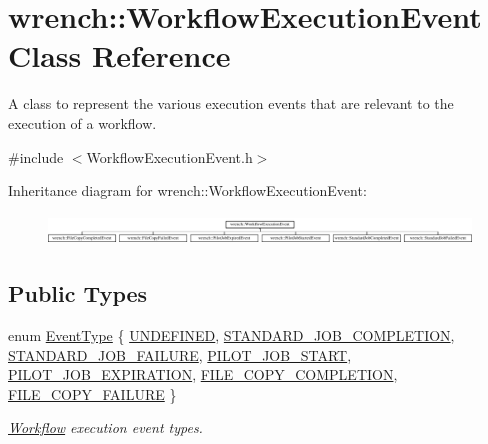 \hypertarget{classwrench_1_1_workflow_execution_event}{}\section{wrench\+:\+:Workflow\+Execution\+Event Class Reference}
\label{classwrench_1_1_workflow_execution_event}


A class to represent the various execution events that are relevant to the execution of a workflow.  




{\ttfamily \#include $<$Workflow\+Execution\+Event.\+h$>$}

Inheritance diagram for wrench\+:\+:Workflow\+Execution\+Event\+:\begin{figure}[H]
\begin{center}
\leavevmode
\includegraphics[height=0.808081cm]{classwrench_1_1_workflow_execution_event}
\end{center}
\end{figure}
\subsection*{Public Types}
\begin{DoxyCompactItemize}
\item 
enum \hyperlink{classwrench_1_1_workflow_execution_event_a5611165191fbc4d121d1b141c748a448}{Event\+Type} \{ \newline
\hyperlink{classwrench_1_1_workflow_execution_event_a5611165191fbc4d121d1b141c748a448a84cf0386ad6c78e81fcd67101b895ec3}{U\+N\+D\+E\+F\+I\+N\+ED}, 
\hyperlink{classwrench_1_1_workflow_execution_event_a5611165191fbc4d121d1b141c748a448a68fddb8efa42e1c770438578f6bac474}{S\+T\+A\+N\+D\+A\+R\+D\+\_\+\+J\+O\+B\+\_\+\+C\+O\+M\+P\+L\+E\+T\+I\+ON}, 
\hyperlink{classwrench_1_1_workflow_execution_event_a5611165191fbc4d121d1b141c748a448a50337d50da65b812bfdf450bf18fa266}{S\+T\+A\+N\+D\+A\+R\+D\+\_\+\+J\+O\+B\+\_\+\+F\+A\+I\+L\+U\+RE}, 
\hyperlink{classwrench_1_1_workflow_execution_event_a5611165191fbc4d121d1b141c748a448acdc1aeb7d7f0638c64d3a8c3cd05c8a4}{P\+I\+L\+O\+T\+\_\+\+J\+O\+B\+\_\+\+S\+T\+A\+RT}, 
\newline
\hyperlink{classwrench_1_1_workflow_execution_event_a5611165191fbc4d121d1b141c748a448a876a714eb40717c19e1450da162208f2}{P\+I\+L\+O\+T\+\_\+\+J\+O\+B\+\_\+\+E\+X\+P\+I\+R\+A\+T\+I\+ON}, 
\hyperlink{classwrench_1_1_workflow_execution_event_a5611165191fbc4d121d1b141c748a448a01537cae4bfcc4d44d2746cd9a3f303f}{F\+I\+L\+E\+\_\+\+C\+O\+P\+Y\+\_\+\+C\+O\+M\+P\+L\+E\+T\+I\+ON}, 
\hyperlink{classwrench_1_1_workflow_execution_event_a5611165191fbc4d121d1b141c748a448a07ede2c05015972efd6121b496739576}{F\+I\+L\+E\+\_\+\+C\+O\+P\+Y\+\_\+\+F\+A\+I\+L\+U\+RE}
 \}\begin{DoxyCompactList}\small\item\em \hyperlink{classwrench_1_1_workflow}{Workflow} execution event types. \end{DoxyCompactList}
\end{DoxyCompactItemize}
